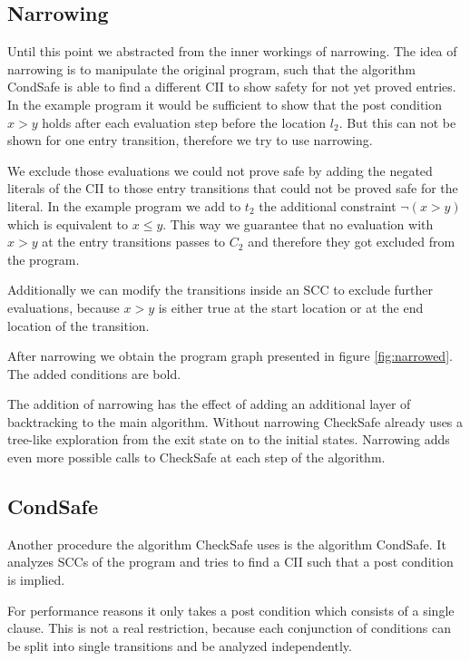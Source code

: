 

\subsection{Narrowing}

Until this point we abstracted from the inner workings of narrowing.
The idea of narrowing is to manipulate the original program, such that the algorithm CondSafe is able to find a different CII to show safety for not yet proved entries.
In the example program it would be sufficient to show that the post condition $x > y$ holds after each evaluation step before the location $l_2$.
But this can not be shown for one entry transition, therefore we try to use narrowing.



We exclude those evaluations we could not prove safe by adding the negated literals of the CII to those entry transitions that could not be proved safe for the literal.
In the example program we add to $t_2$ the additional constraint $\neg (x > y)$ which is equivalent to $x \leq y$.
This way we guarantee that no evaluation with $x > y$ at the entry transitions passes to $C_2$ and therefore they got excluded from the program.

Additionally we can modify the transitions inside an SCC to exclude further evaluations, because $x > y$ is either true at the start location or at the end location of the transition.

After narrowing we obtain the program graph presented in figure \ref{fig:narrowed}. The added conditions are bold.



The addition of narrowing has the effect of adding an additional layer of backtracking to the main algorithm.
Without narrowing CheckSafe already uses a tree-like exploration from the exit state on to the initial states.
Narrowing adds even more possible calls to CheckSafe at each step of the algorithm.

\subsection{CondSafe}

Another procedure the algorithm CheckSafe uses is the algorithm CondSafe.
It analyzes SCCs of the program and tries to find a CII such that a post condition is implied.

For performance reasons it only takes a post condition which consists of a single clause.
This is not a real restriction, because each conjunction of conditions can be split into single transitions and be analyzed independently.

